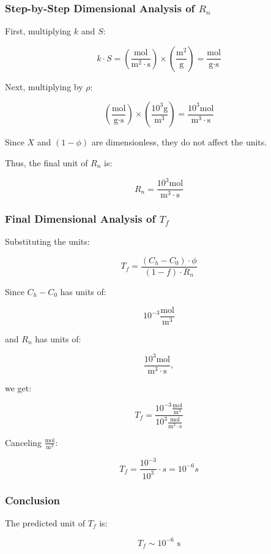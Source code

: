 \subsubsection*{Step-by-Step Dimensional Analysis of \(R_n\)}

First, multiplying \( k \) and \( S \):

\[
k \cdot S = \left(\frac{\text{mol}}{\text{m}^2 \cdot \text{s}}\right) \times \left(\frac{\text{m}^2}{\text{g}}\right) = \frac{\text{mol}}{\text{g} \cdot \text{s}}
\]

Next, multiplying by \( \rho \):

\[
\left(\frac{\text{mol}}{\text{g} \cdot \text{s}}\right) \times \left(\frac{10^3 \text{g}}{\text{m}^3}\right) = \frac{10^3 \text{mol}}{\text{m}^3 \cdot \text{s}}
\]

Since \( X \) and \( (1 - \phi) \) are dimensionless, they do not affect the units.

Thus, the final unit of \( R_n \) is:

\[
R_n = \frac{10^3 \text{mol}}{\text{m}^3 \cdot \text{s}}
\]

\subsubsection*{Final Dimensional Analysis of \(T_f\)}

Substituting the units:

\[
T_f = \frac{(C_h - C_0) \cdot \phi}{(1 - f) \cdot R_n}
\]

Since \( C_h - C_0 \) has units of:

\[
10^{-3} \frac{\text{mol}}{\text{m}^3}
\]

and \( R_n \) has units of:

\[
\frac{10^3 \text{mol}}{\text{m}^3 \cdot \text{s}},
\]

we get:

\[
T_f = \frac{10^{-3} \frac{\text{mol}}{\text{m}^3}}{10^3 \frac{\text{mol}}{\text{m}^3 \cdot \text{s}}}
\]

Canceling \( \frac{\text{mol}}{\text{m}^3} \):

\[
T_f = \frac{10^{-3}}{10^3} \cdot s = 10^{-6} s
\]

\subsubsection*{Conclusion}

The predicted unit of \( T_f \) is:

\[
T_f \sim 10^{-6} \text{ s}
\]

